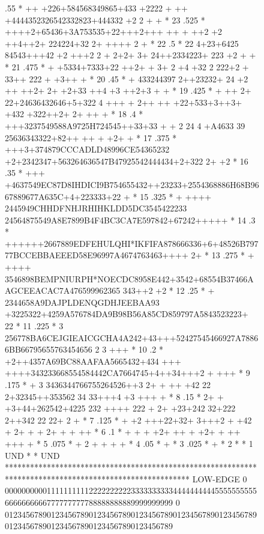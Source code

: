 \begin{figure}[p]
\begin{XMPfrac}{3.3}
     .55   *               ++ +226+584568349865+433 +2222 +      ++ +4444352326542332823+444332 +2 2 + +          *  23
     .525  *                 ++++2+65436+3A753535+22+++2+++  ++ + ++2  +2 ++4++2+ 224224+32 2+ ++++ 2      +      *  22
     .5    *                 22  4+23+6425 84543+++42 +2     +++2  2 + 2+2+ 3+ 24++2334223+ 223  +2   +       +   *  21
     .475  *         +             +5334+7333+22  ++2+ +  3+      2 +4 +32  2 222+2 + 33++ 222 +  +3++     +      *  20
     .45   *                  +  433244397 2++23232+ 24 +2        ++  ++2+ 2+ +2+33  ++4 +3 ++2+3    +  +         *  19
     .425  *           +  ++ 2+ 22+24636432646+5+322 4 +++ + 2++  ++ +22+533+3++3+  +432 +322++2+     2+  ++ +    *  18
     .4    *                +++3237549588A9725H724545++33+33 + + 2 24  4 +A4633 39 25636343322+82++ ++ + +2+  +   *  17
     .375  *              +++3+374879CCCADLD48996CE54365232 +2+2342347+563264636547B47925542444434+2+322 2+  +2   *  16
     .35   *            +++ +4637549EC87D8IHDICI9B754655432++23233+2554368886H68B9667889677A635C+4+223333+22  +   *  15
     .325  *        +  ++++ 2445949CHHDFNHJRHIHKLDD5DC3545422233 24564875549A8E7899B4F4BC3CA7E597842+67242+++++   *  14
     .3    *          ++++++2667889EDFEHULQHI*IKFIFA878666336+6+48526B79777BCCEBBAEEED58E96997A4674763463++++ 2+  *  13
     .275  *        +  ++++ 3546898BEMPNIURPH*NOECDC8958E442+3542+68554B37466AAGCEEACAC7A476599962365 343++2 +2   *  12
     .25   *        +     2344658A9DAJPLDENQGDHJEEBAA93 +3225322+4259A576784DA9B98B56A85CD859797A5843523223+ 22   *  11
     .225  *               3 256778BA6CEJGIEAICGCHA4A242+43+++52427545466927A78866BB66795655763454656  2 3 +++    *  10
     .2    *                +2++4357A69BC88AAFAA5665432+434 +++ ++++343233668554584442CA7664745+4++34+++2 + +++   *   9
     .175  *                 + 3  3436344766755264526++3 2+ + ++ +42  22 2+32345++353562 34 33+++4 +3 +++  +      *   8
     .15   *                  2+ + +3+44+262542+4225 232 ++++   222 + 2+  +23+242 32+222 2++342 22    22+ 2  +    *   7
     .125  *              +   +2  +++22+32+ 3+++2                    +  +42 +  2+ +   +  2+       + + ++          *   6
     .1    *                           +  +   + +2+     ++             +    +2+    +        ++    +++ +           *   5
     .075  *                       + 2  +     +                          +                               +        *   4
     .05   *                                      +                                                               *   3
     .025  *                                                                         +                            *   2
           *                                                                                                      *   1
  UND      *                                                                                                      * UND
           ********************************************************************************************************
LOW-EDGE   0 0000000000111111111122222222223333333333444444444455555555556666666666777777777788888888889999999999
           0 0123456789012345678901234567890123456789012345678901234567890123456789012345678901234567890123456789
 

\end{XMPfrac}
\end{figure}
